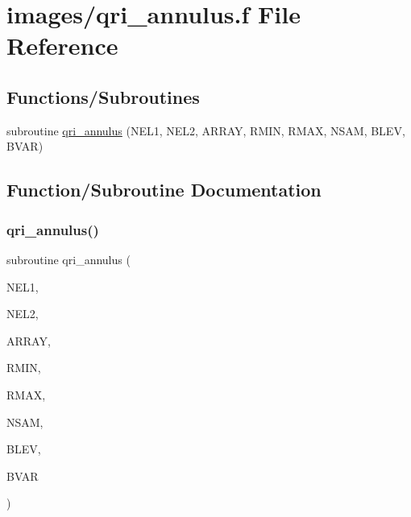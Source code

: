 \hypertarget{qri__annulus_8f}{}\section{images/qri\+\_\+annulus.f File Reference}
\label{qri__annulus_8f}
\subsection*{Functions/\+Subroutines}
\begin{DoxyCompactItemize}
\item 
subroutine \hyperlink{qri__annulus_8f_a6663867cc56870f36a74b61e888cc6ee}{qri\+\_\+annulus} (N\+E\+L1, N\+E\+L2, A\+R\+R\+AY, R\+M\+IN, R\+M\+AX, N\+S\+AM, B\+L\+EV, B\+V\+AR)
\end{DoxyCompactItemize}


\subsection{Function/\+Subroutine Documentation}
\mbox{\label{qri__annulus_8f_a6663867cc56870f36a74b61e888cc6ee}} 
\subsubsection{\texorpdfstring{qri\+\_\+annulus()}{qri\_annulus()}}
{\footnotesize\ttfamily subroutine qri\+\_\+annulus (\begin{DoxyParamCaption}\item[{integer}]{N\+E\+L1,  }\item[{integer}]{N\+E\+L2,  }\item[{double precision, dimension(nel1,nel2)}]{A\+R\+R\+AY,  }\item[{double precision}]{R\+M\+IN,  }\item[{double precision}]{R\+M\+AX,  }\item[{integer}]{N\+S\+AM,  }\item[{double precision}]{B\+L\+EV,  }\item[{double precision}]{B\+V\+AR }\end{DoxyParamCaption})}

